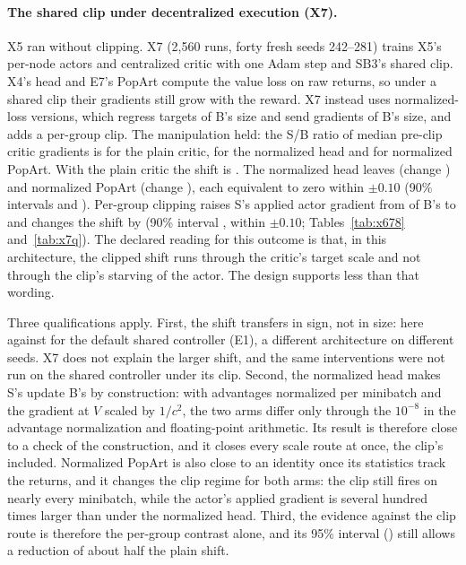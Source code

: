 \paragraph{The shared clip under decentralized execution (X7).}
X5 ran without clipping. X7 (2,560 runs, forty fresh seeds 242--281) trains X5's per-node actors and centralized critic
with one Adam step and SB3's shared clip. X4's head and E7's PopArt compute the value loss on raw returns, so under a
shared clip their gradients still grow with the reward. X7 instead uses normalized-loss versions, which regress
targets of B's size and send gradients of B's size, and adds a per-group clip. The manipulation held: the S/B ratio of
median pre-clip critic gradients is \VxsevGradPlain{} for the plain critic, \VxsevGradHead{} for the normalized head and
\VxsevGradPop{} for normalized PopArt. With the plain critic the shift is \VxsevPlain{}. The normalized head leaves
\VxsevHead{} (change \VxsevChHead{}) and normalized PopArt \VxsevPop{} (change \VxsevChPop{}), each equivalent to zero
within $\pm0.10$ (90\% intervals \VxsevHeadNinety{} and \VxsevPopNinety{}). Per-group clipping raises S's applied actor
gradient from \VxsevAppliedPlain{} of B's to \VxsevAppliedGroup{} and changes the shift by \VxsevChGroup{} (90\% interval
\VxsevChGroupNinety{}, within $\pm0.10$; Tables~\ref{tab:x678} and~\ref{tab:x7q}). The declared reading for this
outcome is that, in this architecture, the clipped shift runs through the critic's target scale and not through the
clip's starving of the actor. The design supports less than that wording.

Three qualifications apply. First, the shift transfers in sign, not in size: \VxsevPlain{} here against \VjtPStd{} for
the default shared controller (E1), a different architecture on different seeds. X7 does not explain the larger shift,
and the same interventions were not run on the shared controller under its clip. Second, the normalized head makes S's
update B's by construction: with advantages normalized per minibatch and the gradient at $V$ scaled by $1/c^2$, the two
arms differ only through the $10^{-8}$ in the advantage normalization and floating-point arithmetic. Its result is
therefore close to a check of the construction, and it closes every scale route at once, the clip's included. Normalized
PopArt is also close to an identity once its statistics track the returns, and it changes the clip regime for both arms: the clip still fires on nearly every
minibatch, while the actor's applied gradient is several hundred times larger than under the normalized head. Third,
the evidence against the clip route is therefore the per-group contrast alone, and its 95\% interval
(\VxsevChGroup{}) still allows a reduction of about half the plain shift.

